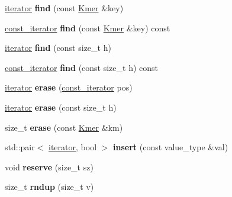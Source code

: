 \begin{DoxyCompactItemize}
\hyperlink{classKmerHashTable_1_1iterator__}{iterator} {\bfseries find} (const \hyperlink{classKmer}{Kmer} \&key)
\item 
\mbox{\label{structKmerHashTable_aa691566ef3df69a0368c1066a204ec9e}} 
\hyperlink{classKmerHashTable_1_1iterator__}{const\+\_\+iterator} {\bfseries find} (const \hyperlink{classKmer}{Kmer} \&key) const
\item 
\mbox{\label{structKmerHashTable_a1df8499d3477ab104b0bf39afe06c35e}} 
\hyperlink{classKmerHashTable_1_1iterator__}{iterator} {\bfseries find} (const size\+\_\+t h)
\item 
\mbox{\label{structKmerHashTable_adb9c76301acad71190f2912fbef34212}} 
\hyperlink{classKmerHashTable_1_1iterator__}{const\+\_\+iterator} {\bfseries find} (const size\+\_\+t h) const
\item 
\mbox{\label{structKmerHashTable_ab0c90b491977753e28fee09a69236dc7}} 
\hyperlink{classKmerHashTable_1_1iterator__}{iterator} {\bfseries erase} (\hyperlink{classKmerHashTable_1_1iterator__}{const\+\_\+iterator} pos)
\item 
\mbox{\label{structKmerHashTable_a50bf87b80d4dda47c7b03391ee6c2ca6}} 
\hyperlink{classKmerHashTable_1_1iterator__}{iterator} {\bfseries erase} (const size\+\_\+t h)
\item 
\mbox{\label{structKmerHashTable_a3d59c0201f58523115382e04e81a8564}} 
size\+\_\+t {\bfseries erase} (const \hyperlink{classKmer}{Kmer} \&km)
\item 
\mbox{\label{structKmerHashTable_a81c6f3d860ab90e7d15671a5cafb0ead}} 
std\+::pair$<$ \hyperlink{classKmerHashTable_1_1iterator__}{iterator}, bool $>$ {\bfseries insert} (const value\+\_\+type \&val)
\item 
\mbox{\label{structKmerHashTable_a73bd87d1c64d1a2275982a0fc7edfeed}} 
void {\bfseries reserve} (size\+\_\+t sz)
\item 
\mbox{\label{structKmerHashTable_a04e5ca5c7e31c08c45f147aa7056c9c3}} 
size\+\_\+t {\bfseries rndup} (size\+\_\+t v)

\end{DoxyCompactItemize}

